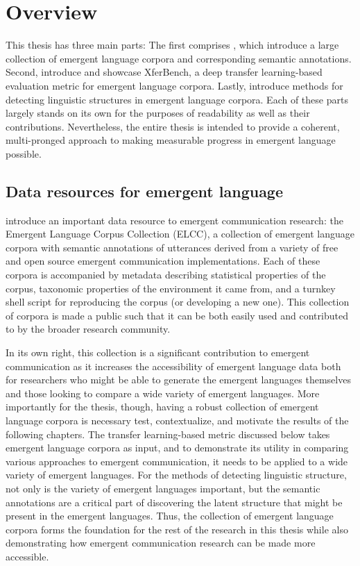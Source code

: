 \section{Overview}

This thesis has three main parts:
The first comprises , which introduce a large collection of emergent language corpora and corresponding semantic annotations.
Second,  introduce and showcase XferBench, a deep transfer learning-based evaluation metric for emergent language corpora.
Lastly,  introduce methods for detecting linguistic structures in emergent language corpora.
Each of these parts largely stands on its own for the purposes of readability as well as their contributions.
Nevertheless, the entire thesis is intended to provide a coherent, multi-pronged approach to making measurable progress in emergent language possible.


\subsection{Data resources for emergent language}
 introduce an important data resource to emergent communication research: the Emergent Language Corpus Collection (ELCC), a collection of emergent language corpora with semantic annotations of utterances derived from a variety of free and open source emergent communication implementations.
Each of these corpora is accompanied by metadata describing statistical properties of the corpus, taxonomic properties of the environment it came from, and a turnkey shell script for reproducing the corpus (or developing a new one).
This collection of corpora is made a public such that it can be both easily used and contributed to by the broader research community.

In its own right, this collection is a significant contribution to emergent communication as it increases the accessibility of emergent language data both for researchers who might be able to generate the emergent languages themselves and those looking to compare a wide variety of emergent languages.
More importantly for the thesis, though, having a robust collection of emergent language corpora is necessary test, contextualize, and motivate the results of the following chapters.
The transfer learning-based metric discussed below takes emergent language corpora as input, and to demonstrate its utility in comparing various approaches to emergent communication, it needs to be applied to a wide variety of emergent languages.
For the methods of detecting linguistic structure, not only is the variety of emergent languages important, but the semantic annotations are a critical part of discovering the latent structure that might be present in the emergent languages.
Thus, the collection of emergent language corpora forms the foundation for the rest of the research in this thesis while also demonstrating how emergent communication research can be made more accessible.

